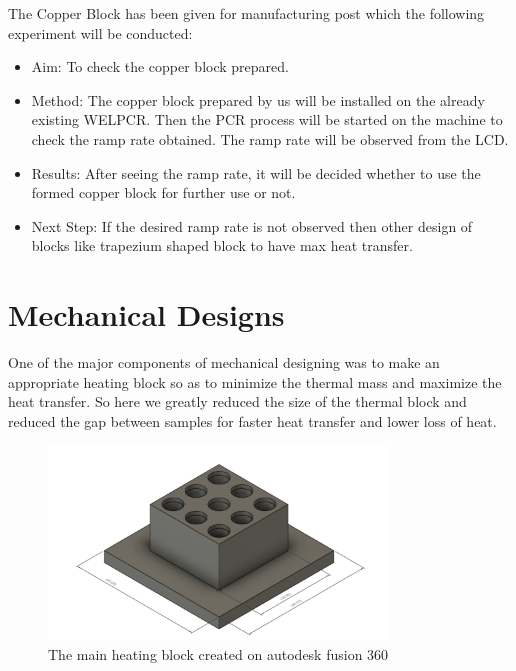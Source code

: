 \documentclass[12pt]{article}
\begin{document}
The Copper Block has been given for manufacturing post which the following experiment will be conducted:
\begin{itemize}

\item Aim: To check the copper block prepared.
\item Method: The copper block prepared by us will be installed on the already existing WELPCR. Then the PCR process will be started on the machine to check the ramp rate obtained. The ramp rate will be observed from the LCD.
\item Results:  After seeing the ramp rate, it will be decided whether to use the formed copper block for further use or not.
\item Next Step: If the desired ramp rate is not observed then other design of blocks like trapezium shaped block to have max heat transfer.

\end{itemize}
\maketitle
\newpage
\section{Mechanical Designs}

One of the major components of mechanical designing was to make an appropriate heating block so as to minimize the thermal mass and maximize the heat transfer. So here we greatly reduced the size of the thermal block and reduced the gap between samples for faster heat transfer and lower loss of heat.


\begin{figure}[htp]
    \centering
    \includegraphics[width=9cm]{Images/Mainheatingblock.png}
    \caption{The main heating block created on autodesk fusion 360}
    \label{fig:galaxy}
\end{figure}
\end{document}
